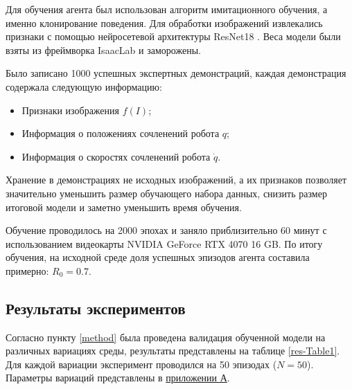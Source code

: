         Для обучения агента был использован алгоритм имитационного обучения, а именно клонирование поведения. Для обработки изображений извлекались признаки с помощью нейросетевой архитектуры ResNet18 \cite{he2015deepresiduallearningimage}. Веса модели были взяты из фреймворка IsaacLab и заморожены. 
        
        Было записано 1000 успешных экспертных демонстраций, каждая демонстрация содержала следующую информацию:~\begin{itemize}
            \item Признаки изображения $f(I)$;
            \item Информация о положениях сочленений робота $q$;
            \item Информация о скоростях сочленений робота $\dot{q}$.
        \end{itemize}

        Хранение в демонстрациях не исходных изображений, а их признаков позволяет значительно уменьшить размер обучающего набора данных, снизить размер итоговой модели и заметно уменьшить время обучения. 

        Обучение проводилось на 2000 эпохах и заняло приблизительно 60 минут с использованием видеокарты NVIDIA GeForce RTX 4070 16 GB. По итогу обучения, на исходной среде доля успешных эпизодов агента составила примерно: $R_0 = 0.7$.

        \subsection{Результаты экспериментов}

            Согласно пункту \ref{method} была проведена валидация обученной модели на различных вариациях среды, результаты представлены на таблице \ref{res-Table1}. Для каждой вариации эксперимент проводился на 50 эпизодах ($N = 50$). Параметры вариаций представлены в \hyperref[sec:results]{приложении А}.

